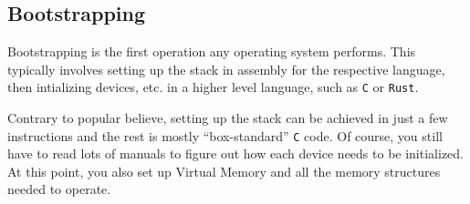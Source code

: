 \subsection{Bootstrapping}
Bootstrapping is the first operation any operating system performs.
This typically involves setting up the stack in assembly for the respective language, then intializing devices, etc. in a higher level language, such as \texttt{C} or \texttt{Rust}.

Contrary to popular believe, setting up the stack can be achieved in just a few instructions and the rest is mostly ``box-standard'' \texttt{C} code.
Of course, you still have to read lots of manuals to figure out how each device needs to be initialized.
At this point, you also set up Virtual Memory and all the memory structures needed to operate.
